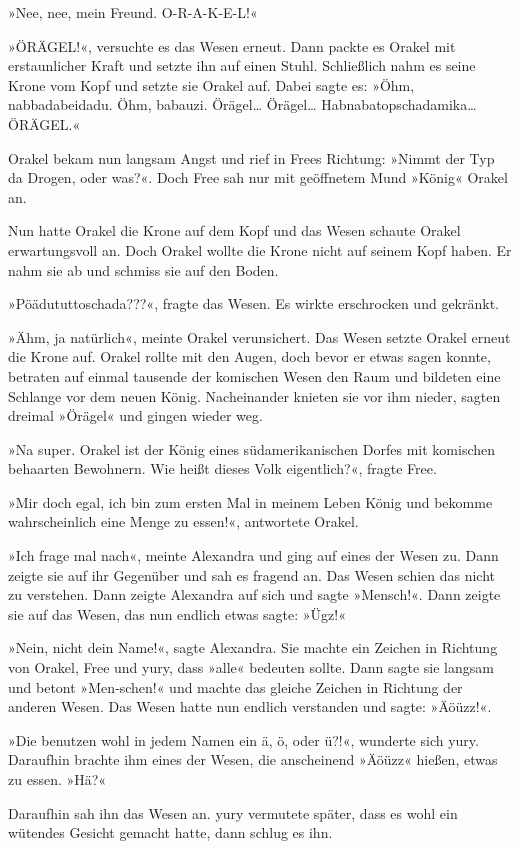 »Nee, nee, mein Freund. O-R-A-K-E-L!«

»ÖRÄGEL!«, versuchte es das Wesen erneut. Dann packte es Orakel mit erstaunlicher Kraft und setzte ihn auf einen Stuhl. Schließlich nahm es seine Krone vom Kopf und setzte sie Orakel auf. Dabei sagte es: »Öhm, nabbadabeidadu. Öhm, babauzi. Örägel… Örägel… Habnabatopschadamika… ÖRÄGEL.«

Orakel bekam nun langsam Angst und rief in Frees Richtung: »Nimmt der Typ da Drogen, oder was?«. Doch Free sah nur mit geöffnetem Mund »König« Orakel an.

Nun hatte Orakel die Krone auf dem Kopf und das Wesen schaute Orakel erwartungsvoll an. Doch Orakel wollte die Krone nicht auf seinem Kopf haben. Er nahm sie ab und schmiss sie auf den Boden.

»Pöädututtoschada???«, fragte das Wesen. Es wirkte erschrocken und gekränkt.

»Ähm, ja natürlich«, meinte Orakel verunsichert. Das Wesen setzte Orakel erneut die Krone auf. Orakel rollte mit den Augen, doch bevor er etwas sagen konnte, betraten auf einmal tausende der komischen Wesen den Raum und bildeten eine Schlange vor dem neuen König. Nacheinander knieten sie vor ihm nieder, sagten dreimal »Örägel« und gingen wieder weg.

»Na super. Orakel ist der König eines südamerikanischen Dorfes mit komischen behaarten Bewohnern. Wie heißt dieses Volk eigentlich?«, fragte Free.

»Mir doch egal, ich bin zum ersten Mal in meinem Leben König und bekomme wahrscheinlich eine Menge zu essen!«, antwortete Orakel.

»Ich frage mal nach«, meinte Alexandra und ging auf eines der Wesen zu. Dann zeigte sie auf ihr Gegenüber und sah es fragend an. Das Wesen schien das nicht zu verstehen. Dann zeigte Alexandra auf sich und sagte »Mensch!«. Dann zeigte sie auf das Wesen, das nun endlich etwas sagte: »Ügz!«

»Nein, nicht dein Name!«, sagte Alexandra. Sie machte ein Zeichen in Richtung von Orakel, Free und yury, dass »alle« bedeuten sollte. Dann sagte sie langsam und betont »Men‑schen!« und machte das gleiche Zeichen in Richtung der anderen Wesen. Das Wesen hatte nun endlich verstanden und sagte: »Äöüzz!«.

»Die benutzen wohl in jedem Namen ein ä, ö, oder ü?!«, wunderte sich yury. Daraufhin brachte ihm eines der Wesen, die anscheinend »Äöüzz« hießen, etwas zu essen. »Hä?«

Daraufhin sah ihn das Wesen an. yury vermutete später, dass es wohl ein wütendes Gesicht gemacht hatte, dann schlug es ihn.

